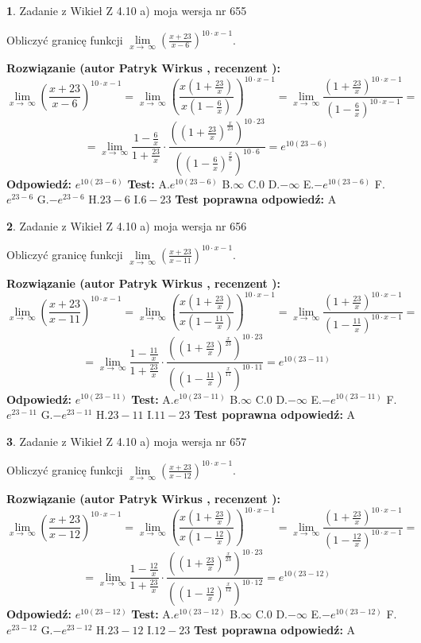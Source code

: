 \documentclass[12pt, a4paper]{article}
\theoremstyle{definition} %
\newtheorem{zad}{}
\newcommand{\zadStart}[1]{\begin{zad}#1\newline}
\newcommand{\zadStop}{\end{zad}}
\newcommand{\rozwStart}[2]{\noindent \textbf{Rozwiązanie (autor #1 , recenzent #2): }\newline}
\newcommand{\rozwStop}{\newline}
\newcommand{\odpStart}{\noindent \textbf{Odpowiedź:}\newline}
\newcommand{\odpStop}{\newline}
\newcommand{\testStart}{\noindent \textbf{Test:}\newline}
\newcommand{\testStop}{\newline}
\newcommand{\kluczStart}{\noindent \textbf{Test poprawna odpowiedź:}\newline}
\newcommand{\kluczStop}{\newline}
\begin{document}
\zadStart{Zadanie z Wikieł Z 4.10 a) moja wersja nr 655}


Obliczyć granicę funkcji  $\lim\limits_{x\to\ \infty}(\frac{x+23}{x-6})^{10\cdot x-1}$.
\zadStop
\rozwStart{Patryk Wirkus}{}
$$\lim\limits_{x\to\ \infty}(\frac{x+23}{x-6})^{10\cdot x-1} = \lim\limits_{x\to\ \infty}(\frac{x(1+\frac{23}{x})}{x(1-\frac{6}{x})})^{10\cdot x-1}=\lim\limits_{x\to\ \infty}\frac{(1+\frac{23}{x})^{10\cdot x-1}}{(1-\frac{6}{x})^{10\cdot x-1}}=$$
$$=\lim\limits_{x\to\ \infty}\frac{1-\frac{6}{x}}{1+\frac{23}{x}}\cdot\frac{((1+\frac{23}{x})^{\frac{x}{23}})^{10\cdot23}}{((1-\frac{6}{x})^{\frac{x}{6}})^{10\cdot6}}=e^{10(23-6)}$$
\rozwStop
\odpStart
$e^{10(23-6)}$
\odpStop
\testStart
A.$e^{10(23-6)}$ B.$\infty$ C.$0$ D.$-\infty$ E.$-e^{10(23-6)}$
F.$e^{23-6}$ G.$-e^{23-6}$
H.$23-6$
I.$6-23$
\testStop
\kluczStart
A
\kluczStop



\zadStart{Zadanie z Wikieł Z 4.10 a) moja wersja nr 656}


Obliczyć granicę funkcji  $\lim\limits_{x\to\ \infty}(\frac{x+23}{x-11})^{10\cdot x-1}$.
\zadStop
\rozwStart{Patryk Wirkus}{}
$$\lim\limits_{x\to\ \infty}(\frac{x+23}{x-11})^{10\cdot x-1} = \lim\limits_{x\to\ \infty}(\frac{x(1+\frac{23}{x})}{x(1-\frac{11}{x})})^{10\cdot x-1}=\lim\limits_{x\to\ \infty}\frac{(1+\frac{23}{x})^{10\cdot x-1}}{(1-\frac{11}{x})^{10\cdot x-1}}=$$
$$=\lim\limits_{x\to\ \infty}\frac{1-\frac{11}{x}}{1+\frac{23}{x}}\cdot\frac{((1+\frac{23}{x})^{\frac{x}{23}})^{10\cdot23}}{((1-\frac{11}{x})^{\frac{x}{11}})^{10\cdot11}}=e^{10(23-11)}$$
\rozwStop
\odpStart
$e^{10(23-11)}$
\odpStop
\testStart
A.$e^{10(23-11)}$ B.$\infty$ C.$0$ D.$-\infty$ E.$-e^{10(23-11)}$
F.$e^{23-11}$ G.$-e^{23-11}$
H.$23-11$
I.$11-23$
\testStop
\kluczStart
A
\kluczStop



\zadStart{Zadanie z Wikieł Z 4.10 a) moja wersja nr 657}


Obliczyć granicę funkcji  $\lim\limits_{x\to\ \infty}(\frac{x+23}{x-12})^{10\cdot x-1}$.
\zadStop
\rozwStart{Patryk Wirkus}{}
$$\lim\limits_{x\to\ \infty}(\frac{x+23}{x-12})^{10\cdot x-1} = \lim\limits_{x\to\ \infty}(\frac{x(1+\frac{23}{x})}{x(1-\frac{12}{x})})^{10\cdot x-1}=\lim\limits_{x\to\ \infty}\frac{(1+\frac{23}{x})^{10\cdot x-1}}{(1-\frac{12}{x})^{10\cdot x-1}}=$$
$$=\lim\limits_{x\to\ \infty}\frac{1-\frac{12}{x}}{1+\frac{23}{x}}\cdot\frac{((1+\frac{23}{x})^{\frac{x}{23}})^{10\cdot23}}{((1-\frac{12}{x})^{\frac{x}{12}})^{10\cdot12}}=e^{10(23-12)}$$
\rozwStop
\odpStart
$e^{10(23-12)}$
\odpStop
\testStart
A.$e^{10(23-12)}$ B.$\infty$ C.$0$ D.$-\infty$ E.$-e^{10(23-12)}$
F.$e^{23-12}$ G.$-e^{23-12}$
H.$23-12$
I.$12-23$
\testStop
\kluczStart
A
\kluczStop
\end{document}
